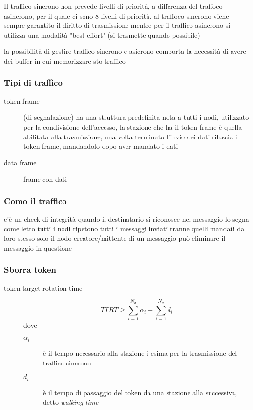 \documentclass[11pt]{article}
\begin{document}
Il traffico sincrono non prevede livelli di priorità, a differenza del traffoco asincrono, per il quale ci sono 8 livelli di priorità.
al traffoco sincrono viene sempre garantito il diritto di trasmissione mentre per il traffico asincrono si utilizza una modalità "best effort" (si trasmette quando possibile)

la possibilità di gestire traffico sincrono e asicrono comporta la necessità di avere dei buffer in cui memorizzare sto traffico

\subsubsection{Tipi di traffico}
\label{sec:org85e533f}
\begin{description}
\item[{token frame}] (di segnalazione) ha una struttura predefinita nota a tutti i nodi, utilizzato per la condivisione dell'accesso, la stazione che ha il token frame è quella abilitata alla trasmissione, una volta terminato l'invio dei dati rilascia il token frame, mandandolo dopo aver mandato i dati
\item[{data frame}] frame con dati
\end{description}

\subsubsection{Como il traffico}
\label{sec:org83e70b0}
c'è un check di integrità
quando il destinatario si riconosce nel messaggio lo segna come letto
tutti i nodi ripetono tutti i messaggi inviati tranne quelli mandati da loro stesso
solo il nodo creatore/mittente di un messaggio può eliminare il messaggio in questione

\subsubsection{Sborra token}
\label{sec:org0b14d37}
\begin{description}
\item[{token target rotation time}] \[ TTRT \geq \sum_{i = 1}^{N_d} \alpha _i + \sum_{i=1}^{N_d} d_i \]
dove
\begin{description}
\item[{\(\alpha _i\)}] è il tempo necessario alla stazione i-esima per la trasmissione del traffico sincrono
\item[{\(d_i\)}] è il tempo di passaggio del token da una stazione alla successiva, detto \emph{walking time}
\end{description}
\end{description}
\end{document}
